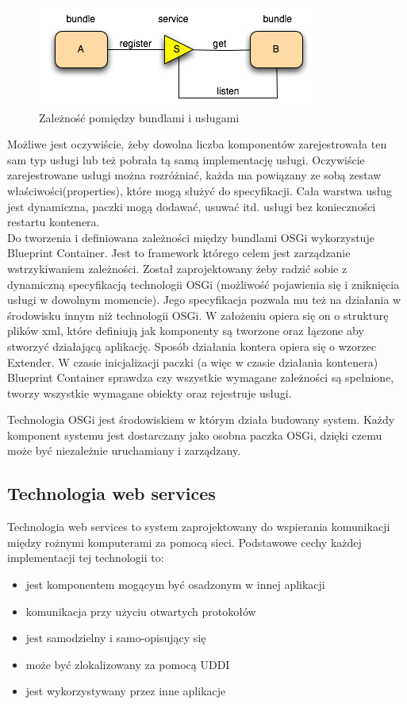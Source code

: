 \begin{figure}[!h]
	\centering
	\includegraphics[scale=0.75]{serveLayer.png} 
	\caption{Zależność pomiędzy bundlami i usługami}
\end{figure}
 Możliwe jest oczywiście, żeby dowolna liczba komponentów zarejestrowała ten sam typ usługi lub też pobrała tą samą implementację usługi. Oczywiście zarejestrowane usługi można rozróżniać, każda ma powiązany ze sobą zestaw właściwości(properties), które mogą służyć do specyfikacji. Cała warstwa usług jest dynamiczna, paczki mogą dodawać, usuwać itd. usługi bez konieczności restartu kontenera.  \\
Do tworzenia i definiowana zależności między bundlami OSGi wykorzystuje Blueprint Container. Jest to framework którego celem jest zarządzanie wstrzykiwaniem zależności. Został zaprojektowany żeby radzić sobie z dynamiczną specyfikacją technologii OSGi (możliwość pojawienia się i zniknięcia usługi w dowolnym momencie). Jego specyfikacja pozwala mu też na działania w środowisku innym niż technologii OSGi. W założeniu opiera się on o strukturę plików xml, które definiują jak komponenty są tworzone oraz łączone aby stworzyć działającą aplikację. Sposób działania kontera opiera się o wzorzec Extender. W czasie inicjalizacji paczki (a więc w czasie działania kontenera) Blueprint Container sprawdza czy wszystkie wymagane zależności są spełnione, tworzy wszystkie wymagane obiekty oraz rejestruje usługi. 

Technologia OSGi jest środowiskiem w którym działa budowany system. Każdy komponent systemu jest dostarczany jako osobna paczka OSGi, dzięki czemu może być niezależnie uruchamiany i zarządzany. 

\subsection{Technologia web services}
Technologia web services to system zaprojektowany do wspierania komunikacji między rożnymi komputerami za pomocą sieci.  Podstawowe cechy każdej implementacji tej technologii to:
\begin{itemize}
	\item jest komponentem mogącym być osadzonym w innej aplikacji
	\item komunikacja przy użyciu otwartych protokołów
	\item jest samodzielny i samo-opisujący się
	\item może być zlokalizowany za pomocą UDDI
	\item jest wykorzystywany przez inne aplikacje
\end{itemize}  

